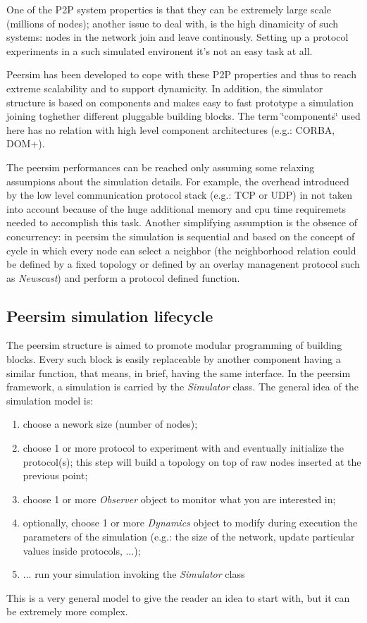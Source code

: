 \documentclass[a4paper,11pt]{article}
\begin{document}
One of the P2P system properties is that they can be extremely large
scale (millions of nodes); another issue to deal with, is the high
dinamicity of such systems: nodes in the network join and leave continously.
Setting up a protocol experiments in a such simulated environent it's
not an easy task at all.

Peersim has been developed to cope with these P2P properties and thus
to reach extreme scalability and to support dynamicity. In addition,
the simulator structure is based on components and makes easy to fast
prototype a simulation joining toghether different pluggable building
blocks. The term \char`\"{}components\char`\"{} used here has no relation
with high level component architectures (e.g.: CORBA, DOM+).

The peersim performances can be reached only assuming some relaxing
assumpions about the simulation details. For example, the overhead
introduced by the low level communication protocol stack (e.g.: TCP
or UDP) in not taken into account because of the huge additional memory
and cpu time requiremets needed to accomplish this task. Another simplifying
assumption is the obsence of concurrency: in peersim the simulation
is sequential and based on the concept of cycle in which every node
can select a neighbor (the neighborhood relation could be defined
by a fixed topology or defined by an overlay managenent protocol such
as \emph{Newscast}) and perform a protocol defined function.


\subsection{Peersim simulation lifecycle}

The peersim structure is aimed to promote modular programming of building
blocks. Every such block is easily replaceable by another component
having a similar function, that means, in brief, having the same interface.
In the peersim framework, a simulation is carried by the \emph{Simulator}
class. The general idea of the simulation model is: 

\begin{enumerate}
\item choose a nework size (number of nodes); 
\item choose 1 or more protocol to experiment with and eventually initialize
the protocol(s); this step will build a topology on top of raw nodes
inserted at the previous point;
\item choose 1 or more \emph{Observer} object to monitor what you are interested
in; 
\item optionally, choose 1 or more \emph{Dynamics} object to modify during
execution the parameters of the simulation (e.g.: the size of the
network, update particular values inside protocols, ...); 
\item ... run your simulation invoking the \emph{Simulator} class
\end{enumerate}
This is a very general model to give the reader an idea to start with,
but it can be extremely more complex. 
\end{document}
